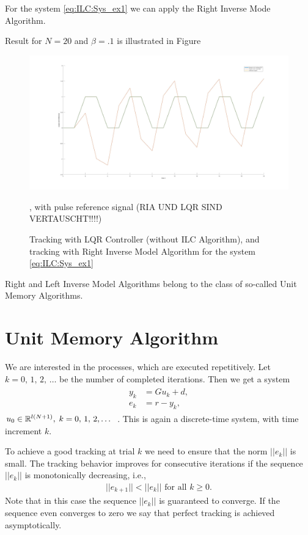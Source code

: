 \begin{exam}
	For the system \eqref{eq:ILC:Sys_ex1} we can apply the Right Inverse Mode Algorithm. 
	
	Result for $N = 20$ and $\beta = .1$ is illustrated in Figure  
	
	\begin{figure}[ht]
		\label{img:ILC:RIA}
		\includegraphics[width=\textwidth]{fig/RIA.jpg}
		\caption{Tracking with LQR Controller (without ILC Algorithm), and tracking with Right Inverse Model Algorithm for the system \eqref{eq:ILC:Sys_ex1}}, with pulse reference signal (RIA UND LQR SIND VERTAUSCHT!!!!) %
	\end{figure}
	
	
\end{exam}

Right and Left Inverse Model Algorithms belong to the class of so-called Unit Memory Algorithms. 

\section{Unit Memory Algorithm}

We are interested in  the processes, which are executed repetitively. Let $k = 0, \, 1, \, 2, \, \dots $ be the number of completed iterations. Then we get a system 
\begin{align}
\label{eq:unitMemory}
\begin{split}
y_{k} &= G u_k + d,  \\ %
e_k &= r - y_k, 
\end{split}
\end{align}
$u_{0} \in {\mathbb{R}}^{l(N+1)},  \; k =0, \,  1, \, 2, \dots $ .
This is again a discrete-time system, with time increment $k$. 

To achieve a good tracking at trial $k$ we need to ensure that the norm $||e_k||$ is small. 
The tracking behavior improves for consecutive iterations if the sequence $||e_k||$ is monotonically decreasing, i.e., 
\begin{align}
||e_{k+1} || < ||e_k|| \text{ for all } k \geq 0.
\end{align}
Note that in this case the sequence $||e_k||$ is guaranteed to converge. If the sequence even converges to zero we say that perfect tracking is achieved asymptotically.


